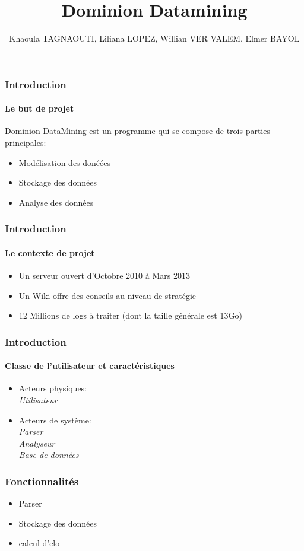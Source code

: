 \documentclass{beamer}
\title{Dominion Datamining}
\author{Khaoula TAGNAOUTI, Liliana LOPEZ, Willian VER VALEM, Elmer BAYOL}
\begin{document}
\maketitle


\begin{frame}
  \frametitle{Introduction}
  \framesubtitle{Le but de projet}
  Dominion DataMining est un programme qui se compose de trois parties principales:
  \begin{itemize}
  \item Modélisation des donéées
  \item Stockage des données
  \item Analyse des données
  \end{itemize}
\end{frame}

\begin{frame}
  \frametitle{Introduction}
  \framesubtitle{Le contexte de projet}
  
  \begin{itemize}
    \item Un serveur ouvert d'Octobre 2010 à Mars 2013
    \item Un Wiki offre des conseils au niveau de stratégie
    \item 12 Millions de logs à traiter (dont la taille générale est 13Go)
  
  \end{itemize}

\end{frame}
\begin{frame}
  \frametitle{Introduction}
  \framesubtitle{Classe de l'utilisateur et caractéristiques}
 
  \begin{itemize}
    \item Acteurs physiques:
     ~~\\
     \textit{Utilisateur}
      ~~\\
    \item Acteurs de système:  
      ~~\\
     \textit{Parser}
       ~~\\
     \textit{Analyseur}
      ~~\\
     \textit{Base de données}
      ~~\\
     
  \end{itemize}

\end{frame}
  

\begin{frame}
  \frametitle{Fonctionnalités}
  \begin{itemize}
  \item Parser
  \item Stockage des données
  \item calcul d'elo
  \end{itemize}
\end{frame}
\end{document}
